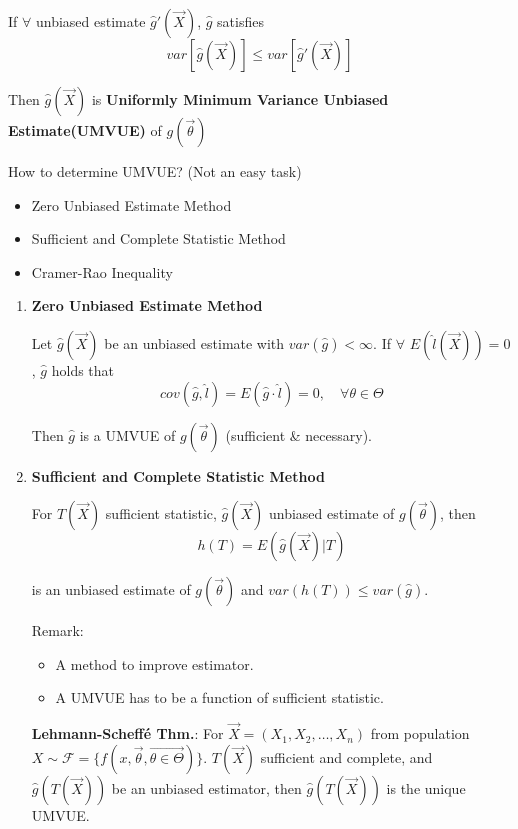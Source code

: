 \documentclass[11pt,a4paper]{ctexart}
\numberwithin{equation}{section}%
\begin{document}
        If $\forall$ unbiased estimate $\hat{g}\prime(\vec{X})$, $\hat{g}$ satisfies
        \[
            var[\hat{g}(\vec{X})]\leq var[\hat{g}\prime(\vec{X})]    
        \]

        Then $\hat{g}(\vec{X})$ is \textbf{Uniformly Minimum Variance Unbiased Estimate(UMVUE)} of $g(\vec{\theta})$

        How to determine UMVUE? (Not an easy task)
        \begin{itemize}
            \item Zero Unbiased Estimate Method
            \item Sufficient and Complete Statistic Method
            \item Cramer-Rao Inequality
        \end{itemize}

\begin{enumerate}
\item \textbf{Zero Unbiased Estimate Method}
            
    Let $\hat{g}(\vec{X})$ be an unbiased estimate with $var(\hat{g})<\infty$. If $\forall$ $E(\hat{l}(\vec{X}))=0$ , $\hat{g}$ holds that
    \[
        cov(\hat{g},\hat{l})=E(\hat{g}\cdot\hat{l})=0,\quad\forall\theta\in\Theta    
    \]

    Then $\hat{g}$ is a UMVUE of $g(\vec{\theta})$ (sufficient \& necessary).





\item \textbf{Sufficient and Complete Statistic Method}

    For $T(\vec{X})$ sufficient statistic, $\hat{g}(\vec{X})$ unbiased estimate of $g(\vec{\theta})$, then 
\[
    h(T)=E(\hat{g}(\vec{X})| T)    
\]

    is an unbiased estimate of $g(\vec{\theta})$ and $var(h(T))\leq var(\hat{g})$.

    Remark:
    \begin{itemize}
        \item A method to improve estimator.
        \item A UMVUE has to be a function of sufficient statistic.
    \end{itemize}

    \textbf{Lehmann-Scheffé Thm.}: For $\vec{X}=(X_1,X_2,\ldots,X_n)$ from population $X\sim\mathscr{F}=\{f(x,\vec{\theta},\vec{\theta\in\Theta})\}$. $T(\vec{X})$ sufficient and complete, and $\hat{g}(T(\vec{X}))$ be an unbiased estimator, then $\hat{g}(T(\vec{X}))$ is the unique UMVUE.


\end{enumerate}
\end{document}
